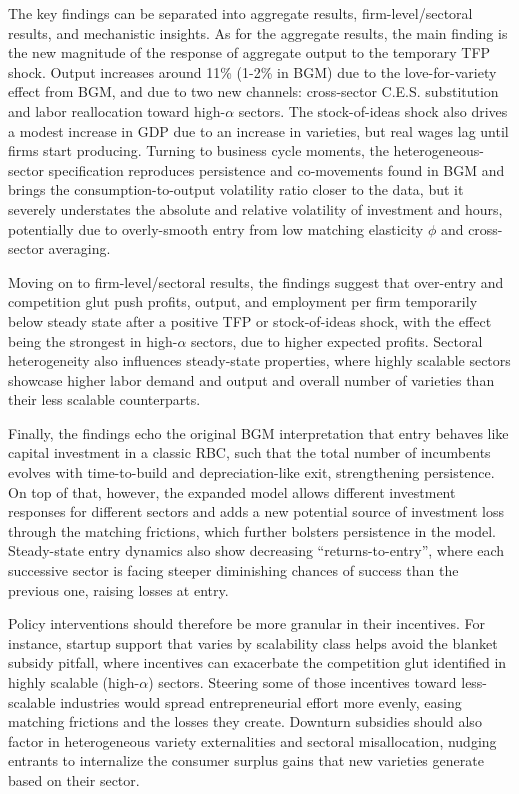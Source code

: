 \documentclass[a4paper,12pt]{article} %
\numberwithin{equation}{section} %
\numberwithin{figure}{section}
\numberwithin{table}{section}
\begin{document}
The key findings can be separated into aggregate results, firm-level/sectoral results, and mechanistic insights. As for the aggregate results,
the main finding is the new magnitude of the response of aggregate output to the temporary TFP shock. Output increases around 11\%  (1-2\% in BGM) due to 
the love-for-variety effect from BGM, and due to two new channels: cross-sector C.E.S. substitution and labor reallocation toward high-$\alpha$ sectors.
The stock-of-ideas shock also drives a modest increase in GDP due to an increase in varieties, but real wages lag until firms start producing.
Turning to business cycle moments, the heterogeneous-sector specification reproduces persistence and co-movements found in BGM and brings the 
consumption-to-output volatility ratio closer to the data, but it severely understates the absolute and relative volatility of investment and hours, potentially
due to overly-smooth entry from low matching elasticity $\phi$ and cross-sector averaging.

Moving on to firm-level/sectoral results, the findings suggest that over-entry and competition glut push profits, output, and employment per firm 
temporarily below steady state after a positive TFP or stock-of-ideas shock, with the effect being the strongest in high-$\alpha$ sectors, due to higher
expected profits. Sectoral heterogeneity also influences steady-state properties, where highly scalable sectors showcase higher labor demand and output 
and overall number of varieties than their less scalable counterparts.

Finally, the findings echo the original BGM interpretation that entry behaves like capital investment in a classic RBC, such that the total number of
incumbents evolves with time-to-build and depreciation-like exit, strengthening persistence. On top of that, however, the expanded model allows 
different investment responses for different sectors and adds a new potential source of investment loss through the matching frictions, 
which further bolsters persistence in the model. Steady-state entry dynamics also show decreasing ``returns-to-entry'', where each successive sector is 
facing steeper diminishing chances of success than the previous one, raising losses at entry.

Policy interventions should therefore be more granular in their incentives. For instance, startup support that varies by scalability class helps avoid 
the blanket subsidy pitfall, where incentives can exacerbate the competition glut identified in highly scalable (high-$\alpha$) sectors. 
Steering some of those incentives toward less-scalable industries would spread entrepreneurial effort more evenly, easing matching 
frictions and the losses they create. Downturn subsidies should also factor in heterogeneous variety externalities and sectoral misallocation, 
nudging entrants to internalize the consumer surplus gains that new varieties generate based on their sector.
\end{document}
